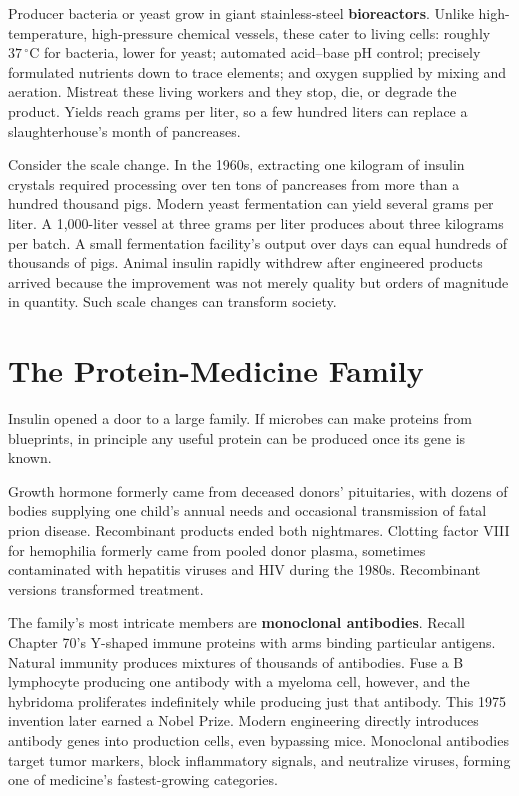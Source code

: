 Producer bacteria or yeast grow in giant stainless-steel \textbf{bioreactors}. Unlike high-temperature, high-pressure chemical vessels, these cater to living cells: roughly $37\,^{\circ}\mathrm{C}$ for bacteria, lower for yeast; automated acid--base pH control; precisely formulated nutrients down to trace elements; and oxygen supplied by mixing and aeration. Mistreat these living workers and they stop, die, or degrade the product. Yields reach grams per liter, so a few hundred liters can replace a slaughterhouse's month of pancreases.

\begin{qiaoliang}
Consider the scale change. In the 1960s, extracting one kilogram of insulin crystals required processing over ten tons of pancreases from more than a hundred thousand pigs. Modern yeast fermentation can yield several grams per liter. A 1,000-liter vessel at three grams per liter produces about three kilograms per batch. A small fermentation facility's output over days can equal hundreds of thousands of pigs. Animal insulin rapidly withdrew after engineered products arrived because the improvement was not merely quality but orders of magnitude in quantity. Such scale changes can transform society.
\end{qiaoliang}

\section{The Protein-Medicine Family}

Insulin opened a door to a large family. If microbes can make proteins from blueprints, in principle any useful protein can be produced once its gene is known.

Growth hormone formerly came from deceased donors' pituitaries, with dozens of bodies supplying one child's annual needs and occasional transmission of fatal prion disease. Recombinant products ended both nightmares. Clotting factor VIII for hemophilia formerly came from pooled donor plasma, sometimes contaminated with hepatitis viruses and HIV during the 1980s. Recombinant versions transformed treatment.

The family's most intricate members are \textbf{monoclonal antibodies}. Recall Chapter 70's Y-shaped immune proteins with arms binding particular antigens. Natural immunity produces mixtures of thousands of antibodies. Fuse a B lymphocyte producing one antibody with a myeloma cell, however, and the hybridoma proliferates indefinitely while producing just that antibody. This 1975 invention later earned a Nobel Prize. Modern engineering directly introduces antibody genes into production cells, even bypassing mice. Monoclonal antibodies target tumor markers, block inflammatory signals, and neutralize viruses, forming one of medicine's fastest-growing categories.

